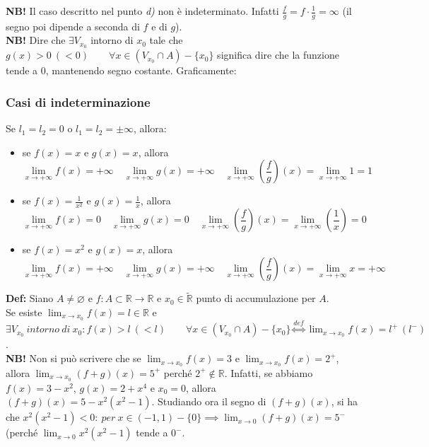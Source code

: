 \documentclass{article}
\begin{document}
\noindent\textbf{NB!} Il caso descritto nel punto \textit{d)} non è indeterminato. Infatti $\frac{f}{g} = f\cdot\frac{1}{g} = \infty$ (il segno poi dipende a seconda di $f$ e di $g$).\\

\noindent\textbf{NB!} Dire che $\exists V_{x_0}$ intorno di $x_0$ tale che $g(x) > 0 \ (< 0) \qquad \forall x \in (V_{x_0} \cap A) - \{x_0\}$ significa dire che la funzione tende a $0$, mantenendo segno costante. Graficamente:

\subsubsection{Casi di indeterminazione}
Se $l_1 = l_2 = 0$ o $l_1 = l_2 = \pm\infty$, allora:

\begin{itemize}
    \item se $f(x) = x$ e $g(x) = x$, allora $$\lim_{x \to +\infty} f(x) = +\infty \quad \lim_{x \to +\infty} g(x) = + \infty \quad \lim_{x \to +\infty} \left(\dfrac{f}{g}\right)(x) = \lim_{x \to +\infty} 1 = 1$$
    \item se $f(x) = \frac{1}{x^2}$ e $g(x) = \frac{1}{x}$, allora $$\lim_{x \to +\infty} f(x) = 0 \quad \lim_{x \to +\infty} g(x) = 0 \quad \lim_{x \to +\infty} \left(\dfrac{f}{g}\right)(x) = \lim_{x \to +\infty} \left(\dfrac{1}{x}\right) = 0$$
    \item se $f(x) = x^2$ e $g(x) = x$, allora $$\lim_{x \to +\infty} f(x) = +\infty \quad \lim_{x \to +\infty} g(x) = +\infty \quad \lim_{x \to +\infty} \left(\dfrac{f}{g}\right)(x) = \lim_{x \to +\infty} x = +\infty$$
\end{itemize}

\noindent\textbf{Def:} Siano $A \neq \varnothing$ e $f: A \subset \mathbb{R} \xrightarrow{} \mathbb{R}$ e $x_0 \in \widetilde{\mathbb{R}}$ punto di accumulazione per $A$. \\
Se esiste $\lim_{x \to x_0} f(x) = l \in \mathbb{R}$ e $\exists V_{x_0} \ intorno \ di \ x_0 : f(x) > l \ (< l) \qquad \forall x \in (V_{x_0} \cap A) - \{x_0\} \overset{def}{\iff} \lim_{x \to x_0} f(x) = l^+ \ (l^-)$.\\

\noindent\textbf{NB!} Non si può scrivere che se $\lim_{x \to x_0} f(x) = 3$ e $\lim_{x \to x_0} f(x) = 2^+$, allora $\lim_{x \to x_0} (f + g)(x) = 5^+$ perché $2^+ \notin \mathbb{R}$. Infatti, se abbiamo $f(x) = 3 - x^2$, $g(x) = 2 + x ^4$ e $x_0 = 0$, allora $(f + g)(x) = 5 - x^2(x^2 - 1)$. Studiando ora il segno di $(f + g)(x)$, si ha che $x^2(x^2 - 1) < 0 : \ per \ x \in (-1, 1) - \{0\} \implies \lim_{x \to 0} (f + g)(x) = 5^-$ (perché $\lim_{x \to 0} x^2(x^2 - 1)$ tende a $0^-$.
\end{document}
